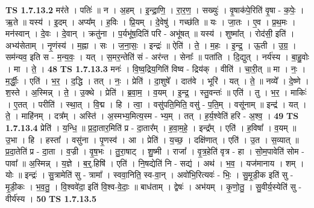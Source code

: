 \documentclass[17pt]{extarticle}
\begin{document}
                  \newline
                                \textbf{ TS 1.7.13.2} \newline
                  मर॑ते । पतिः॑ ॥ न । अ॒हम् । इ॒न्द्रा॒णि॒ । रा॒र॒ण॒ । सख्युः॑ । वृ॒षाक॑पे॒रिति॑ वृ॒षा - क॒पेः॒ । ऋ॒ते ॥ यस्य॑ । इ॒दम् । अप्य᳚म् । ह॒विः । प्रि॒यम् । दे॒वेषु॑ । गच्छ॑ति ॥ यः । जा॒तः । ए॒व । प्र॒थ॒मः । मन॑स्वान् । दे॒वः । दे॒वान् । क्रतु॑ना । प॒र्यभू॑ष॒दिति॑ परि - अभू॑षत् ॥ यस्य॑ । शुष्मा᳚त् । रोद॑सी॒ इति॑ । अभ्य॑सेताम् । नृ॒णंस्य॑ । म॒ह्ना । सः । ज॒ना॒सः॒ । इन्द्रः॑ ॥ ऐति॑ । ते॒ । म॒हः । इ॒न्द्र॒ । ऊ॒ती । उ॒ग्र॒ । सम॑न्यव॒ इति स - म॒न्य॒वः॒ । यत् । स॒मर॒न्तेति॑ सं - अर॑न्त । सेनाः᳚ ॥ पता॑ति । दि॒द्युत् । नर्य॑स्य । बा॒हु॒वोः । मा । ते॒ । \textbf{  48} \newline
                  \newline
                                \textbf{ TS 1.7.13.3} \newline
                  मनः॑ । वि॒ष्व॒द्रिय॒गिति॑ विष्व - द्रिय॑क् । वीति॑ । चा॒री॒त् ॥ मा । नः॒ । म॒र्द्धीः॒ । एति॑ । भ॒र॒ । द॒द्धि । तत् । नः॒ । प्रेति॑ । दा॒शुषे᳚ । दात॑वे । भूरि॑ । यत् । ते॒ ॥ नव्ये᳚ । दे॒ष्णे । श॒स्ते । अ॒स्मिन्न् । ते॒ । उ॒क्थे । प्रेति॑ । ब्र॒वा॒म॒ । व॒यम् । इ॒न्द्र॒ । स्तु॒वन्तः॑ ॥ एति॑ । तु । भ॒र॒ । माकिः॑ । ए॒तत् । परीति॑ । स्था॒त् । वि॒द्म । हि । त्वा॒ । वसु॑पति॒मिति॒ वसु॑ - प॒ति॒म् । वसू॑नाम् ॥ इन्द्र॑ । यत् । ते॒ । माहि॑नम् । दत्र᳚म् । अस्ति॑ । अ॒स्मभ्य॒मित्य॒स्म - भ्य॒म् । तत् । ह॒र्य॒श्वेति॑ हरि - अ॒श्व॒ । \textbf{  49} \newline
                  \newline
                                \textbf{ TS 1.7.13.4} \newline
                  प्रेति॑ । य॒न्धि॒ ॥ प्र॒दा॒तार॒मिति॑ प्र - दा॒तार᳚म् । ह॒वा॒म॒हे॒ । इन्द्र᳚म् । एति॑ । ह॒विषा᳚ । व॒यम् ॥ उ॒भा । हि । हस्ता᳚ । वसु॑ना । पृ॒णस्व॑ । आ । प्रेति॑ । य॒च्छ॒ । दक्षि॑णात् । एति॑ । उ॒त । स॒व्यात् ॥ प्र॒दा॒तेति॑ प्र - दा॒ता । व॒ज्री । वृ॒ष॒भः । तु॒रा॒षाट् । शु॒ष्मी । राजा᳚ । वृ॒त्र॒हेति॑ वृत्र - हा । सो॒म॒पावेति॑ सोम - पावा᳚ ॥ अ॒स्मिन्न् । य॒ज्ञे । ब॒र्॒.हिषि॑ । एति॑ । नि॒षद्येति॑ नि - सद्य॑ । अथ॑ । भ॒व॒ । यज॑मानाय । शम् । योः ॥ इन्द्रः॑ । सु॒त्रामेति॑ सु - त्रामा᳚ । स्ववा॒निति॒ स्व-वा॒न् । अवो॑भि॒रित्यवः॑ - भिः॒ । सु॒मृ॒डी॒क इति॑ सु - मृ॒डी॒कः । भ॒व॒तु॒ । वि॒श्ववे॑दा॒ इति॑ वि॒श्व-वे॒दाः॒ ॥ बाध॑ताम् । द्वेषः॑ । अभ॑यम् । कृ॒णो॒तु॒ । सु॒वीर्य॒स्येति॑ सु - वीर्य॑स्य । \textbf{  50} \newline
                  \newline
                                \textbf{ TS 1.7.13.5} \newline
\end{document}

